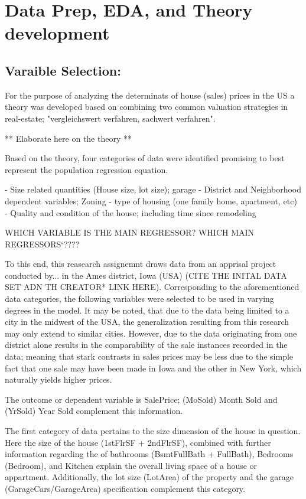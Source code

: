 \documentclass{article}
\begin{document}
\section{Data Prep, EDA, and Theory development}
\subsection{Varaible Selection:}
For the purpose of analyzing the determinats of house (sales) prices in the US a theory was developed based on combining two common valuation strategies in real-estate; "vergleichswert verfahren, sachwert verfahren".


** Elaborate here on the theory **


Based on the theory, four categories of data were identified promising to best represent the population regression equation. 

- Size related quantities (House size, lot size); garage
- District and Neighborhood dependent variables; Zoning
- type of housing (one family home, apartment, etc)
- Quality and condition of the house; including time since remodeling


WHICH VARIABLE IS THE MAIN REGRESSOR? WHICH MAIN REGRESSORS`????

To this end, this reasearch assignemnt draws data from an apprisal project conducted by... in the Ames district, Iowa (USA) (CITE THE INITAL DATA SET ADN TH CREATOR* LINK HERE). Corresponding to the aforementioned data categories, the following variables were selected to be used in varying degrees in the model. It may be noted, that due to the data being limited to a city in the midwest of the USA, the generalization resulting from this research may only extend to similar cities. However, due to the data originating from one district alone results in the comparability of the sale instances recorded in the data; meaning that stark contrasts in sales prices may be less due to the simple fact that one sale may have been made in Iowa and the other in New York, which naturally yields higher prices.



The outcome or dependent variable is SalePrice; (MoSold) Month Sold and
(YrSold) Year Sold complement this information. 

The first category of data pertains to the size dimension of the house in question. Here the size of the house (1stFlrSF + 2ndFlrSF), combined with further information regarding the of bathrooms (BsmtFullBath + FullBath), Bedrooms (Bedroom), and Kitchen explain the overall living space of a house or appartment. Additionally, the lot size (LotArea) of the property and the garage (GarageCars/GarageArea) specification complement this category.
\end{document}
